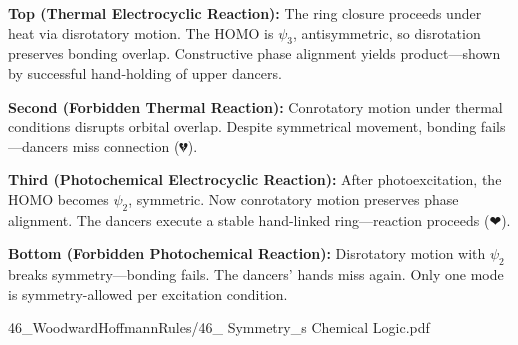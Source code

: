 \begin{SideNotePage}{
  \textbf{Top (Thermal Electrocyclic Reaction):}  
  The ring closure proceeds under heat via disrotatory motion. The HOMO is $\psi_3$, antisymmetric, so disrotation preserves bonding overlap. Constructive phase alignment yields product—shown by successful hand-holding of upper dancers. \par

  \textbf{Second (Forbidden Thermal Reaction):}  
  Conrotatory motion under thermal conditions disrupts orbital overlap. Despite symmetrical movement, bonding fails—dancers miss connection (💔). \par

  \textbf{Third (Photochemical Electrocyclic Reaction):}  
  After photoexcitation, the HOMO becomes $\psi_2$, symmetric. Now conrotatory motion preserves phase alignment. The dancers execute a stable hand-linked ring—reaction proceeds (❤). \par

  \textbf{Bottom (Forbidden Photochemical Reaction):}  
  Disrotatory motion with $\psi_2$ breaks symmetry—bonding fails. The dancers’ hands miss again. Only one mode is symmetry-allowed per excitation condition. \par
}{46_WoodwardHoffmannRules/46_ Symmetry_s Chemical Logic.pdf}
\end{SideNotePage}
